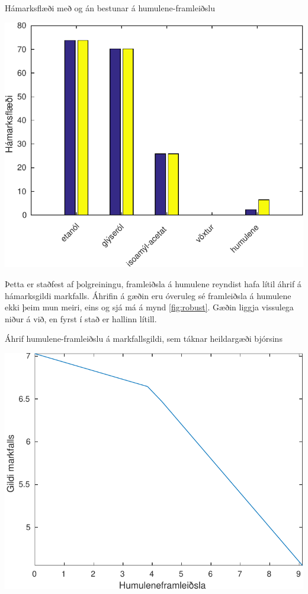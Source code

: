 \documentclass[11pt]{article}
\makeatletter
\newenvironment{figureonecolumn}{\begin{minipage}{\linewidth}\begin{center}\def\@captype{figure}}{\end{center}\end{minipage}}
\makeatother
\begin{document}
\begin{multicols}{2}
\begin{figureonecolumn}
\caption{Hámarksflæði með og án bestunar á humulene-framleiðslu}
\label{fig:maxflow}
\includegraphics[width=\linewidth]{Pics/BrewingMetMaxFlow}
\end{figureonecolumn}

Þetta er staðfest af þolgreiningu, framleiðsla á humulene reyndist hafa lítil áhrif á hámarksgildi markfalls. Áhrifin á gæðin eru óveruleg sé framleiðsla á humulene ekki þeim mun meiri, eins og sjá má á mynd \ref{fig:robust}. Gæðin liggja vissulega niður á við, en fyrst í stað er hallinn lítill.

\begin{figureonecolumn}
\caption{Áhrif humulene-framleiðslu á markfallsgildi, sem táknar heildargæði bjórsins}
\label{fig:robust}
\includegraphics[width=\linewidth]{Pics/BrewingRobustnessAnalysis}
\end{figureonecolumn}

\end{multicols}
\end{document}
